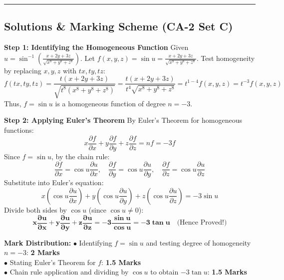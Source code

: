 \vspace{5mm}
\hrule
\vspace{5mm}

\subsection*{Solutions \& Marking Scheme (CA-2 Set C)}

\begin{solutionbox}
\textbf{Step 1: Identifying the Homogeneous Function}
Given $u = \sin^{-1}\left(\frac{x + 2y + 3z}{\sqrt{x^8 + y^8 + z^8}}\right)$.
Let $f(x,y,z) = \sin u = \frac{x + 2y + 3z}{\sqrt{x^8 + y^8 + z^8}}$.
Test homogeneity by replacing $x, y, z$ with $t x, t y, t z$:
\[
f(tx, ty, tz) = \frac{t(x + 2y + 3z)}{\sqrt{t^8(x^8 + y^8 + z^8)}} = \frac{t(x + 2y + 3z)}{t^4 \sqrt{x^8 + y^8 + z^8}} = t^{1-4} f(x,y,z) = t^{-3} f(x,y,z)
\]
Thus, $f = \sin u$ is a homogeneous function of degree $n = -3$.

\textbf{Step 2: Applying Euler's Theorem}
By Euler's Theorem for homogeneous functions:
\[
x \frac{\partial f}{\partial x} + y \frac{\partial f}{\partial y} + z \frac{\partial f}{\partial z} = n f = -3 f
\]
Since $f = \sin u$, by the chain rule:
\[
\frac{\partial f}{\partial x} = \cos u \frac{\partial u}{\partial x}, \quad \frac{\partial f}{\partial y} = \cos u \frac{\partial u}{\partial y}, \quad \frac{\partial f}{\partial z} = \cos u \frac{\partial u}{\partial z}
\]
Substitute into Euler's equation:
\[
x \left(\cos u \frac{\partial u}{\partial x}\right) + y \left(\cos u \frac{\partial u}{\partial y}\right) + z \left(\cos u \frac{\partial u}{\partial z}\right) = -3 \sin u
\]
Divide both sides by $\cos u$ (since $\cos u \neq 0$):
\[
\mathbf{x \frac{\partial u}{\partial x} + y \frac{\partial u}{\partial y} + z \frac{\partial u}{\partial z} = -3 \frac{\sin u}{\cos u} = -3 \tan u} \quad \text{(Hence Proved!)}
\]

\begin{markingrubric}
\textbf{Mark Distribution:}
$\bullet$ Identifying $f = \sin u$ and testing degree of homogeneity $n = -3$: \textbf{2 Marks}\\
$\bullet$ Stating Euler's Theorem for $f$: \textbf{1.5 Marks}\\
$\bullet$ Chain rule application and dividing by $\cos u$ to obtain $-3\tan u$: \textbf{1.5 Marks}
\end{markingrubric}
\end{solutionbox}

